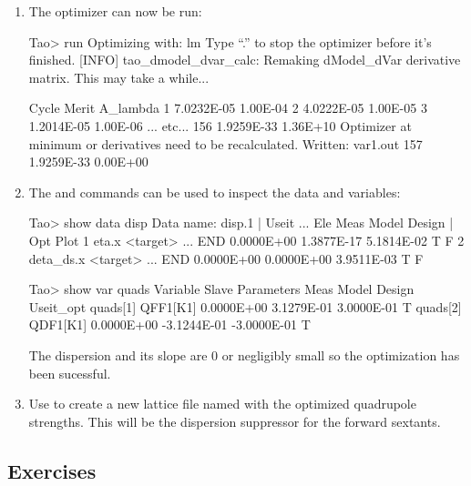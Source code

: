 \documentclass{hitec}     %
\begin{document}
{\begin{enumerate}[leftmargin=*]
\begin{code}
\end{code}
%
\item
The optimizer can now be run:
\begin{code}
Tao> run
Optimizing with: lm
Type ``.'' to stop the optimizer before it's finished.
[INFO] tao_dmodel_dvar_calc:
    Remaking dModel_dVar derivative matrix.
    This may take a while...

  Cycle      Merit    A_lambda
    1    7.0232E-05   1.00E-04
    2    4.0222E-05   1.00E-05
    3    1.2014E-05   1.00E-06
    ... etc...
  156    1.9259E-33   1.36E+10
Optimizer at minimum or derivatives need to be recalculated.
Written: var1.out
  157    1.9259E-33   0.00E+00
\end{code}
%
\item
The  and  commands can be used to inspect the data and variables:
\begin{code}
Tao> show data disp
Data name: disp.1
                                                                   |   Useit
                      ... Ele       Meas        Model       Design | Opt  Plot
1  eta.x <target>     ... END  0.0000E+00   1.3877E-17   5.1814E-02    T     F
2  deta_ds.x <target> ... END  0.0000E+00   0.0000E+00   3.9511E-03    T     F

Tao> show var quads
Variable   Slave Parameters   Meas         Model        Design   Useit_opt
quads[1]   QFF1[K1]       0.0000E+00    3.1279E-01    3.0000E-01         T
quads[2]   QDF1[K1]       0.0000E+00   -3.1244E-01   -3.0000E-01         T
\end{code}
The dispersion and its slope are 0 or negligibly small so the optimization has been sucessful.
%
\item
Use  to create a new lattice file named  with the optimized quadrupole strengths. This will be the dispersion suppressor for the forward sextants.
\end{enumerate}
\subsection{Exercises}

}
\end{document}
